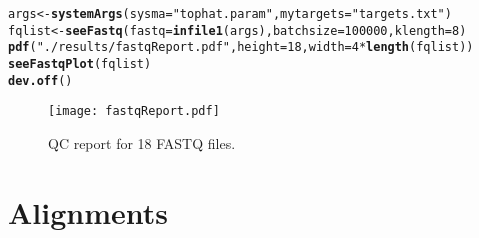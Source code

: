 \documentclass{article}\usepackage[]{graphicx}\usepackage[]{color}
\makeatletter
\newcommand{\hlnum}[1]{\textcolor[rgb]{0.686,0.059,0.569}{#1}}%
\newcommand{\hlstr}[1]{\textcolor[rgb]{0.192,0.494,0.8}{#1}}%
\newcommand{\hlopt}[1]{\textcolor[rgb]{0,0,0}{#1}}%
\newcommand{\hlstd}[1]{\textcolor[rgb]{0.345,0.345,0.345}{#1}}%
\newcommand{\hlkwb}[1]{\textcolor[rgb]{0.69,0.353,0.396}{#1}}%
\newcommand{\hlkwc}[1]{\textcolor[rgb]{0.333,0.667,0.333}{#1}}%
\newcommand{\hlkwd}[1]{\textcolor[rgb]{0.737,0.353,0.396}{\textbf{#1}}}%
\newenvironment{kframe}{%
 \def\at@end@of@kframe{}%
 \ifinner\ifhmode%
  \def\at@end@of@kframe{\end{minipage}}%
  \begin{minipage}{\columnwidth}%
 \fi\fi%
 \def\FrameCommand##1{\hskip\@totalleftmargin \hskip-\fboxsep
 \colorbox{shadecolor}{##1}\hskip-\fboxsep
     \hskip-\linewidth \hskip-\@totalleftmargin \hskip\columnwidth}%
 \MakeFramed {\advance\hsize-\width
   \@totalleftmargin\z@ \linewidth\hsize
   \@setminipage}}%
 {\par\unskip\endMakeFramed%
 \at@end@of@kframe}
\newenvironment{knitrout}{}{} %
\makeatother
\begin{document}
\begin{knitrout}
\color{fgcolor}\begin{kframe}
\begin{alltt}
\hlstd{args} \hlkwb{<-} \hlkwd{systemArgs}\hlstd{(}\hlkwc{sysma}\hlstd{=}\hlstr{"tophat.param"}\hlstd{,} \hlkwc{mytargets}\hlstd{=}\hlstr{"targets.txt"}\hlstd{)}
\hlstd{fqlist} \hlkwb{<-} \hlkwd{seeFastq}\hlstd{(}\hlkwc{fastq}\hlstd{=}\hlkwd{infile1}\hlstd{(args),} \hlkwc{batchsize}\hlstd{=}\hlnum{100000}\hlstd{,} \hlkwc{klength}\hlstd{=}\hlnum{8}\hlstd{)}
\hlkwd{pdf}\hlstd{(}\hlstr{"./results/fastqReport.pdf"}\hlstd{,} \hlkwc{height}\hlstd{=}\hlnum{18}\hlstd{,} \hlkwc{width}\hlstd{=}\hlnum{4}\hlopt{*}\hlkwd{length}\hlstd{(fqlist))}
\hlkwd{seeFastqPlot}\hlstd{(fqlist)}
\hlkwd{dev.off}\hlstd{()}
\end{alltt}
\end{kframe}
\end{knitrout}
\begin{figure}[H]
  \centering
   \texttt{[image: fastqReport.pdf]}
   \caption{QC report for 18 FASTQ files.}
   \label{fig:fastqreport}
\end{figure}

\section{Alignments}
\end{document}
